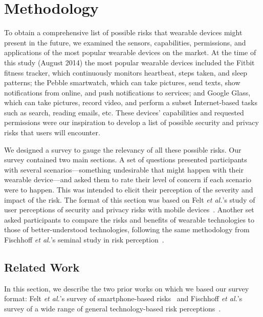 
\section{Methodology}
To obtain a comprehensive list of possible risks that wearable devices might present in the future, we examined the sensors, capabilities, permissions, and applications of the most popular wearable devices on the market. At the time of this study (August 2014) the most popular wearable devices included the Fitbit fitness tracker, which continuously monitors heartbeat, steps taken, and sleep patterns;
the Pebble smartwatch, which can take pictures, send texts, show notifications from online, and push notifications to services; %
and Google Glass, which can take pictures, record video, and perform a subset Internet-based tasks such as search, reading emails, etc. %
These devices' capabilities and requested permissions were our inspiration to develop a list of possible security and privacy risks that users will encounter.

We designed a survey to gauge the relevancy of all these possible risks.
Our survey contained two main sections. A set of questions presented participants with several scenarios---something undesirable that might happen with their wearable device---and asked them to rate their level of concern if each scenario were to happen. This was intended to elicit their perception of the severity and impact of the risk.
The format of this section was based on Felt {\it et al.}'s study of user perceptions of security and privacy risks with mobile devices~\cite{Felt}. Another set asked participants to compare the risks and benefits of wearable technologies to those of better-understood technologies, following the same methodology from Fischhoff {\it et al.}'s seminal study in risk perception~\cite{Fischhoff}.

\subsection{Related Work}
In this section, we describe the two prior works on which we based our survey format: Felt {\it et al.}'s survey of smartphone-based risks~\cite{Felt} and Fischhoff {\it et al.}'s survey of a wide range of general technology-based risk perceptions~\cite{Fischhoff}.

